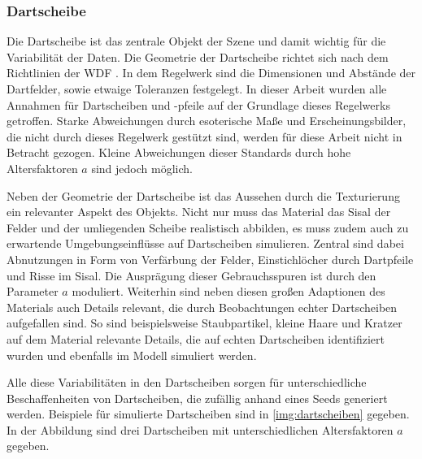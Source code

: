 \subsubsection{Dartscheibe}
\label{sec:met:data:model:obejcts:board}

Die Dartscheibe ist das zentrale Objekt der Szene und damit wichtig für die Variabilität der Daten. Die Geometrie der Dartscheibe richtet sich nach dem Richtlinien  der \ac{WDF} \cite{wdf-rules}. In dem Regelwerk sind die Dimensionen und Abstände der Dartfelder, sowie etwaige Toleranzen festgelegt. In dieser Arbeit wurden alle Annahmen für Dartscheiben und -pfeile auf der Grundlage dieses Regelwerks getroffen. Starke Abweichungen durch esoterische Maße und Erscheinungsbilder, die nicht durch dieses Regelwerk gestützt sind, werden für diese Arbeit nicht in Betracht gezogen. Kleine Abweichungen dieser Standards durch hohe Altersfaktoren $a$ sind jedoch möglich.

Neben der Geometrie der Dartscheibe ist das Aussehen durch die Texturierung ein relevanter Aspekt des Objekts. Nicht nur muss das Material das Sisal der Felder und der umliegenden Scheibe realistisch abbilden, es muss zudem auch zu erwartende Umgebungseinflüsse auf Dartscheiben simulieren. Zentral sind dabei Abnutzungen in Form von Verfärbung der Felder, Einstichlöcher durch Dartpfeile und Risse im Sisal. Die Ausprägung dieser Gebrauchsspuren ist durch den Parameter $a$ moduliert.
Weiterhin sind neben diesen großen Adaptionen des Materials auch Details relevant, die durch Beobachtungen echter Dartscheiben aufgefallen sind. So sind beispielsweise Staubpartikel, kleine Haare und Kratzer auf dem Material relevante Details, die auf echten Dartscheiben identifiziert wurden und ebenfalls im Modell simuliert werden.

Alle diese Variabilitäten in den Dartscheiben sorgen für unterschiedliche Beschaffenheiten von Dartscheiben, die zufällig anhand eines Seeds generiert werden. Beispiele für simulierte Dartscheiben sind in \autoref{img:dartscheiben} gegeben. In der Abbildung sind drei Dartscheiben mit unterschiedlichen Altersfaktoren $a$ gegeben.

